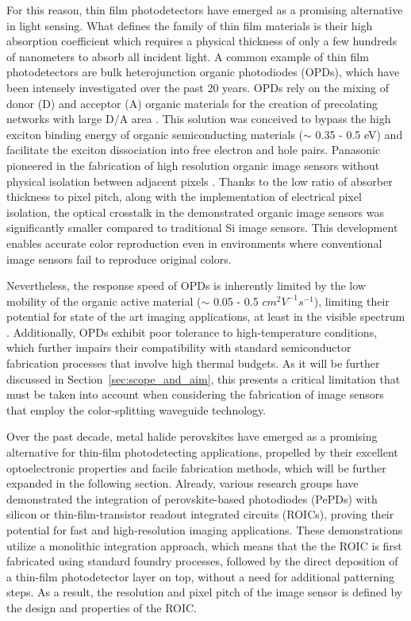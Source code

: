 For this reason, thin film photodetectors have emerged as a promising alternative in light sensing.  What defines the family of thin film materials is their high absorption coefficient which requires a physical thickness of only a few hundreds of nanometers to absorb all incident light. A common example of thin film photodetectors are bulk heterojunction organic photodiodes (OPDs), which have been intensely investigated over the past 20 years. OPDs rely on the mixing of donor (D) and acceptor (A) organic materials for the creation of precolating networks with large D/A area \cite{Scharber2013EfficiencyCells}. This solution was conceived to bypass the high exciton binding energy of organic semiconducting materials ($\sim$ 0.35 - 0.5 eV) and facilitate the exciton dissociation into free electron and hole pairs. Panasonic pioneered in the fabrication of high resolution organic image sensors without physical isolation between adjacent pixels \cite{Takase2015FirstFilm, Machida2018ASensitivity, Nishimura2016AnSensor, Nishimura2018AnCanceller}. Thanks to the low ratio of absorber thickness to pixel pitch, along with the implementation of electrical pixel isolation, the optical crosstalk in the demonstrated organic image sensors was significantly smaller compared to traditional Si image sensors. This development enables accurate color reproduction even in environments where conventional image sensors fail to reproduce original colors.

Nevertheless, the response speed of OPDs is inherently limited by the low mobility of the organic active material ($\sim$ 0.05 - 0.5 $cm^2V^{-1}s^{-1}$), limiting their potential for state of the art imaging applications, at least in the visible spectrum \cite{Nishimura2018AnCanceller}. Additionally, OPDs exhibit poor tolerance to high-temperature conditions, which further impairs their compatibility with standard semiconductor fabrication processes that involve high thermal budgets. As it will be further discussed in Section~\ref{sec:scope_and_aim}, this presents a critical limitation that must be taken into account when considering the fabrication of image sensors that employ the color-splitting waveguide technology. 


Over the past decade, metal halide perovskites have emerged as a promising alternative for thin-film photodetecting applications, propelled by their excellent optoelectronic properties and facile fabrication methods, which will be further expanded in the following section. Already, various research groups have demonstrated the integration of perovskite-based photodiodes (PePDs) with silicon \cite{Song2024HalideImager, Wang2024ASensor, Yen2016ALayer} or thin-film-transistor \cite{Deumel2021High-sensitivityPerovskites,vanBreemen2021APerovskites, Tsarev2025VerticallyPhotodetectors} readout integrated circuits (ROICs), proving their potential for fast and high-resolution imaging applications. These demonstrations utilize a monolithic integration approach, which means that the the ROIC is first fabricated using standard foundry processes, followed by the direct deposition of a thin-film photodetector layer on top, without a need for additional patterning steps. As a result, the resolution and pixel pitch of the image sensor is defined by the design  and properties of the ROIC. 


